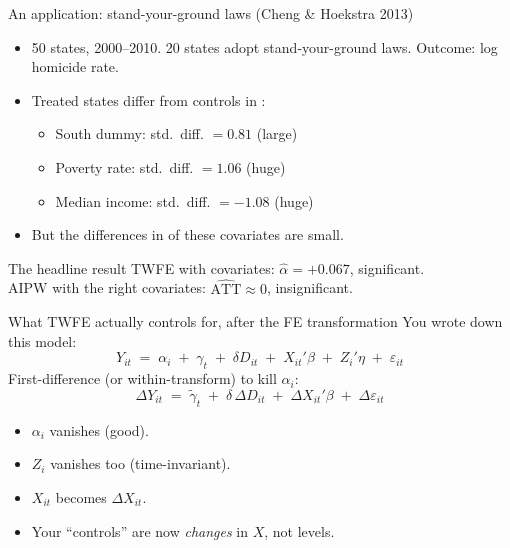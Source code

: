\documentclass[aspectratio=169,11pt]{beamer}
\begin{document}
\begin{frame}{An application: stand-your-ground laws (Cheng \& Hoekstra 2013)}
\vspace{0.5em}
\begin{itemize}\small
  \item 50 states, 2000--2010. 20 states adopt stand-your-ground laws. Outcome: log homicide rate.
  \item Treated states differ from controls in :
  \begin{itemize}\small
    \item[--] South dummy: std.\ diff. $= 0.81$  (large)
    \item[--] Poverty rate:  std.\ diff. $= 1.06$  (huge)
    \item[--] Median income: std.\ diff. $= -1.08$ (huge)
  \end{itemize}
  \item But the differences in  of these covariates are small.
\end{itemize}
\vspace{0.6em}
\begin{block}{The headline result}
\small
TWFE with covariates: \;\;$\widehat{\alpha} = +0.067$, \;significant. \\
AIPW with the right covariates: \;$\widehat{\text{ATT}} \approx 0$, insignificant.\\[0.3em]
\end{block}
\end{frame}

\begin{frame}{What TWFE actually controls for, after the FE transformation}
\vspace{0.4em}
You wrote down this model:
\vspace{-0.1em}
\[
Y_{it} \;=\; \alpha_i \;+\; \gamma_t \;+\; \delta D_{it} \;+\; X_{it}'\beta \;+\; Z_i'\eta \;+\; \varepsilon_{it}
\]
\vspace{0.1em}
First-difference (or within-transform) to kill $\alpha_i$:
\vspace{-0.2em}
\[
\Delta Y_{it} \;=\; \widetilde{\gamma}_t \;+\; \delta\, \Delta D_{it} \;+\; \Delta X_{it}'\beta \;+\; \Delta \varepsilon_{it}
\]
\vspace{0.1em}
\begin{itemize}\small
  \item $\alpha_i$ vanishes (good).
  \item $Z_i$ vanishes too (time-invariant). 
  \item $X_{it}$ becomes $\Delta X_{it}$. 
  \item Your ``controls'' are now \textit{changes} in $X$, not levels.
\end{itemize}
\end{frame}
\end{document}
